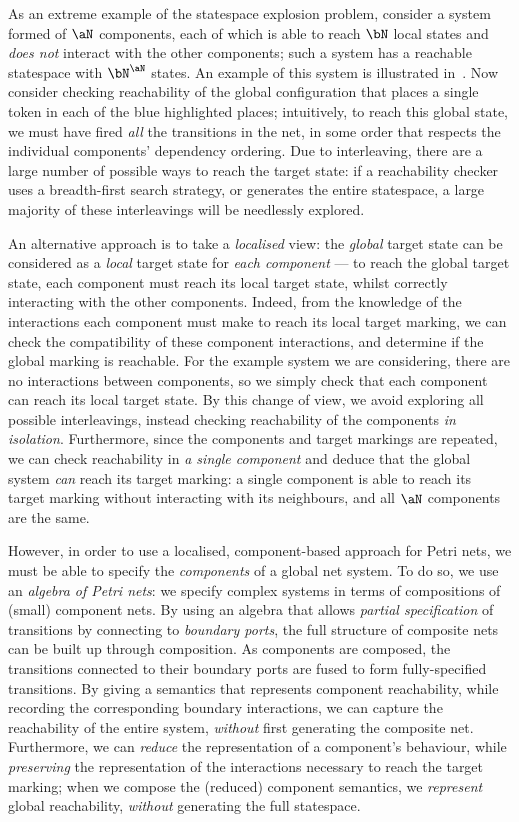 As an extreme example of the statespace explosion problem, consider a system
formed of $\aN$ components, each of which is able to reach $\bN$ local states
and \emph{does not} interact with the other components; such a system has a
reachable statespace with $\bN^\aN$ states. An example of this system is
illustrated in~. Now consider checking reachability
of the global configuration that places a single token in each of the blue
highlighted places; intuitively, to reach this global state, we must have fired
\emph{all} the transitions in the net, in some order that respects the
individual components' dependency ordering. Due to interleaving, there are a
large number of possible ways to reach the target state: if a reachability
checker uses a breadth-first search strategy, or generates the entire
statespace, a large majority of these interleavings will be needlessly
explored.

An alternative approach is to take a \emph{localised} view: the \emph{global}
target state can be considered as a \emph{local} target state for \emph{each
component} --- to reach the global target state, each component must reach its
local target state, whilst correctly interacting with the other components.
Indeed, from the knowledge of the interactions each component must make to
reach its local target marking, we can check the compatibility of these
component interactions, and determine if the global marking is reachable. For
the example system we are considering, there are no interactions between
components, so we simply check that each component can reach its local target
state. By this change of view, we avoid exploring all possible interleavings,
instead checking reachability of the components \emph{in isolation}.
Furthermore, since the components and target markings are repeated, we can
check reachability in \emph{a single component} and deduce that the global
system \emph{can} reach its target marking: a single component is able to reach
its target marking without interacting with its neighbours, and all $\aN$
components are the same.

However, in order to use a localised, component-based approach for Petri nets,
we must be able to specify the \emph{components} of a global net system. To do
so, we use an \emph{algebra of Petri nets}: we specify complex systems in terms
of compositions of (small) component nets. By using an algebra that allows
\emph{partial specification} of transitions by connecting to \emph{boundary
ports}, the full structure of composite nets can be built up through
composition. As components are composed, the transitions connected to their
boundary ports are fused to form fully-specified transitions.  By giving a
semantics that represents component reachability, while recording the
corresponding boundary interactions, we can capture the reachability of the
entire system, \emph{without} first generating the composite net. Furthermore,
we can \emph{reduce} the representation of a component's behaviour, while
\emph{preserving} the representation of the interactions necessary to reach the
target marking; when we compose the (reduced) component semantics, we
\emph{represent} global reachability, \emph{without} generating the full
statespace.

